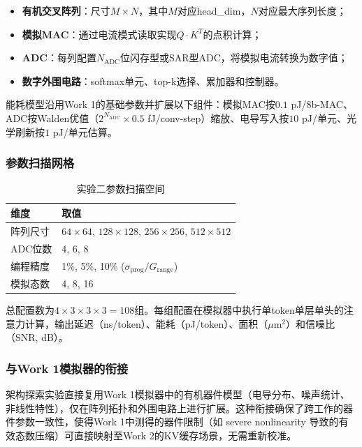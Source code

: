 \begin{itemize}
    \item \textbf{有机交叉阵列}：尺寸$M \times N$，其中$M$对应head\_dim，$N$对应最大序列长度；
    \item \textbf{模拟MAC}：通过电流模式读取实现$Q \cdot K^T$的点积计算；
    \item \textbf{ADC}：每列配置$N_{\text{ADC}}$位闪存型或SAR型ADC，将模拟电流转换为数字值；
    \item \textbf{数字外围电路}：softmax单元、top-k选择、累加器和控制器。
\end{itemize}

能耗模型沿用Work 1的基础参数并扩展以下组件：模拟MAC按$0.1$ pJ/8b-MAC、ADC按Walden优值（$2^{N_{\text{ADC}}} \times 0.5$ fJ/conv-step）缩放、电导写入按$10$ pJ/单元、光学刷新按$1$ pJ/单元估算。

\subsubsection{参数扫描网格}

\begin{table}[htbp]
\centering
\caption{实验二参数扫描空间}
\label{tab:exp2_grid}
\begin{tabular}{ll}
\toprule
维度 & 取值 \\
\midrule
阵列尺寸 & $64\times64$, $128\times128$, $256\times256$, $512\times512$ \\
ADC位数 & 4, 6, 8 \\
编程精度 & 1\%, 5\%, 10\% ($\sigma_{\text{prog}} / G_{\text{range}}$) \\
模拟态数 & 4, 8, 16 \\
\bottomrule
\end{tabular}
\end{table}

总配置数为$4 \times 3 \times 3 \times 3 = 108$组。每组配置在模拟器中执行单token单层单头的注意力计算，输出延迟（ns/token）、能耗（pJ/token）、面积（$\mu$m$^2$）和信噪比（SNR, dB）。

\subsubsection{与Work 1模拟器的衔接}

架构探索实验直接复用Work 1模拟器中的有机器件模型（电导分布、噪声统计、非线性特性），仅在阵列拓扑和外围电路上进行扩展。这种衔接确保了跨工作的器件参数一致性，使得Work 1中测得的器件限制（如 severe nonlinearity 导致的有效态数压缩）可直接映射至Work 2的KV缓存场景，无需重新校准。

